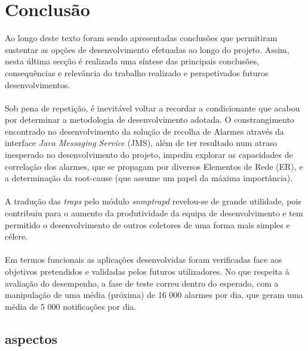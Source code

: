 \chapter{Conclusão}
Ao longo deste texto foram sendo apresentadas conclusões que permitiram sustentar as opções de desenvolvimento efetuadas ao longo do projeto. Assim, nesta última secção é realizada uma síntese das principais conclusões, consequências e relevância do trabalho realizado e perspetivados futuros desenvolvimentos.
\\
\\
Sob pena de repetição, é inevitável voltar a recordar a condicionante que acabou por determinar a metodologia de desenvolvimento adotada. O constrangimento encontrado no desenvolvimento da solução de recolha de Alarmes através da interface \textit{Java Messaging Service} (JMS), além de ter resultado num atraso inesperado no desenvolvimento do projeto, impediu explorar as capacidades de correlação dos alarmes, que se propagam por diversos Elementos de Rede (ER), e a determinação da root-cause (que assume um papel da máxima importância).
\\
\\
A tradução das \textit{traps} pelo módulo \textit{snmptrapd} revelou-se de grande utilidade, pois contribuiu para o aumento da produtividade da equipa de desenvolvimento e tem permitido o desenvolvimento de outros coletores de uma forma mais simples e célere.
\\
\\
Em termos funcionais as aplicações desenvolvidas foram verificadas face aos objetivos pretendidos e validadas pelos futuros utilizadores. No que respeita à avaliação do desempenho, a fase de teste correu dentro do esperado, com a manipulação de uma média (próxima) de 16 000 alarmes por dia, que geram uma média de 5 000 notificações por dia.
\section{aspectos}
